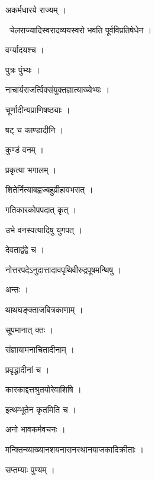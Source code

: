 \documentclass[10pt, openany, oneside]{book}
\begin{document}
\noindent अकर्मधारये राज्यम् ।

\par\noindent\hspace{1.5em}{\vps वा॰}~{\qt चेलराज्यादिस्वरादव्ययस्वरो भवति पूर्वविप्रतिषेधेन ।}

\noindent वर्ग्यादयश्च ।

\noindent पुत्रः पुंभ्यः ।

\noindent नाचार्यराजर्त्विक्संयुक्तज्ञात्याख्येभ्यः ।

\noindent चूर्णादीन्यप्राणिषष्ठ्याः ।

\noindent षट् च काण्डादीनि ।

\noindent कुण्डं वनम् ।

\noindent प्रकृत्या भगालम् ।

\noindent शितेर्नित्याबह्वज्बहुव्रीहावभसत् ।

\noindent गतिकारकोपपदात् कृत् ।

\noindent उभे वनस्पत्यादिषु युगपत् ।

\noindent देवताद्वंद्वे च ।

\noindent नोत्तरपदेऽनुदात्तादावपृथिवीरुद्रपूषमन्थिषु ।

\noindent अन्तः ।

\noindent थाथघङ्क्ताजबित्रकाणाम् ।

\noindent सूपमानात् क्तः ।

\noindent संज्ञायामनाचितादीनाम् ।

\noindent प्रवृद्धादीनां च ।

\noindent कारकाद्दत्तश्रुतयोरेवाशिषि ।

\noindent इत्थम्भूतेन कृतमिति च ।

\noindent अनो भावकर्मवचनः ।

\noindent मन्क्तिन्व्याख्यानशयनासनस्थानयाजकादिक्रीताः ।

\noindent सप्तम्याः पुण्यम् ।
\end{document}

